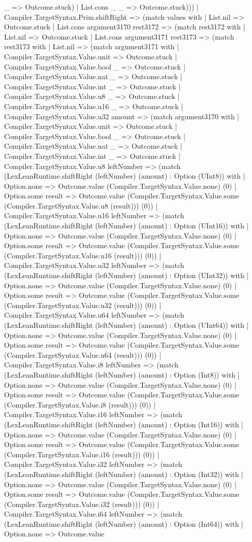 \documentclass[11pt]{article}
\begin{document}
\_ => Outcome.stuck) | List.cons \_ \_ => Outcome.stuck))) | Compiler.TargetSyntax.Prim.shiftRight => (match values with | List.nil => Outcome.stuck | List.cons argument3170 rest3172 => (match rest3172 with | List.nil => Outcome.stuck | List.cons argument3171 rest3173 => (match rest3173 with | List.nil => (match argument3171 with | Compiler.TargetSyntax.Value.unit => Outcome.stuck | Compiler.TargetSyntax.Value.bool \_ => Outcome.stuck | Compiler.TargetSyntax.Value.nat \_ => Outcome.stuck | Compiler.TargetSyntax.Value.int \_ => Outcome.stuck | Compiler.TargetSyntax.Value.u8 \_ => Outcome.stuck | Compiler.TargetSyntax.Value.u16 \_ => Outcome.stuck | Compiler.TargetSyntax.Value.u32 amount => (match argument3170 with | Compiler.TargetSyntax.Value.unit => Outcome.stuck | Compiler.TargetSyntax.Value.bool \_ => Outcome.stuck | Compiler.TargetSyntax.Value.nat \_ => Outcome.stuck | Compiler.TargetSyntax.Value.int \_ => Outcome.stuck | Compiler.TargetSyntax.Value.u8 leftNumber => (match (LexLeanRuntime.shiftRight (leftNumber) (amount) : Option (UInt8)) with | Option.none => Outcome.value (Compiler.TargetSyntax.Value.none) (0) | Option.some result => Outcome.value (Compiler.TargetSyntax.Value.some (Compiler.TargetSyntax.Value.u8 (result))) (0)) | Compiler.TargetSyntax.Value.u16 leftNumber => (match (LexLeanRuntime.shiftRight (leftNumber) (amount) : Option (UInt16)) with | Option.none => Outcome.value (Compiler.TargetSyntax.Value.none) (0) | Option.some result => Outcome.value (Compiler.TargetSyntax.Value.some (Compiler.TargetSyntax.Value.u16 (result))) (0)) | Compiler.TargetSyntax.Value.u32 leftNumber => (match (LexLeanRuntime.shiftRight (leftNumber) (amount) : Option (UInt32)) with | Option.none => Outcome.value (Compiler.TargetSyntax.Value.none) (0) | Option.some result => Outcome.value (Compiler.TargetSyntax.Value.some (Compiler.TargetSyntax.Value.u32 (result))) (0)) | Compiler.TargetSyntax.Value.u64 leftNumber => (match (LexLeanRuntime.shiftRight (leftNumber) (amount) : Option (UInt64)) with | Option.none => Outcome.value (Compiler.TargetSyntax.Value.none) (0) | Option.some result => Outcome.value (Compiler.TargetSyntax.Value.some (Compiler.TargetSyntax.Value.u64 (result))) (0)) | Compiler.TargetSyntax.Value.i8 leftNumber => (match (LexLeanRuntime.shiftRight (leftNumber) (amount) : Option (Int8)) with | Option.none => Outcome.value (Compiler.TargetSyntax.Value.none) (0) | Option.some result => Outcome.value (Compiler.TargetSyntax.Value.some (Compiler.TargetSyntax.Value.i8 (result))) (0)) | Compiler.TargetSyntax.Value.i16 leftNumber => (match (LexLeanRuntime.shiftRight (leftNumber) (amount) : Option (Int16)) with | Option.none => Outcome.value (Compiler.TargetSyntax.Value.none) (0) | Option.some result => Outcome.value (Compiler.TargetSyntax.Value.some (Compiler.TargetSyntax.Value.i16 (result))) (0)) | Compiler.TargetSyntax.Value.i32 leftNumber => (match (LexLeanRuntime.shiftRight (leftNumber) (amount) : Option (Int32)) with | Option.none => Outcome.value (Compiler.TargetSyntax.Value.none) (0) | Option.some result => Outcome.value (Compiler.TargetSyntax.Value.some (Compiler.TargetSyntax.Value.i32 (result))) (0)) | Compiler.TargetSyntax.Value.i64 leftNumber => (match (LexLeanRuntime.shiftRight (leftNumber) (amount) : Option (Int64)) with | Option.none => Outcome.value 
\end{document}

